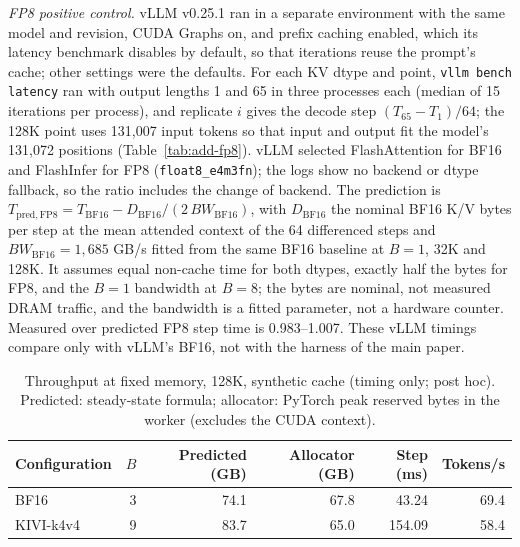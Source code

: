 \textit{FP8 positive control.}
vLLM v0.25.1 ran in a separate environment with the same model and revision, CUDA Graphs on, and prefix caching enabled, which its latency benchmark disables by default, so that iterations reuse the prompt's cache; other settings were the defaults.
For each KV dtype and point, \texttt{vllm bench latency} ran with output lengths 1 and 65 in three processes each (median of 15 iterations per process), and replicate $i$ gives the decode step $(T_{65} - T_1)/64$; the 128K point uses 131,007 input tokens so that input and output fit the model's 131,072 positions (Table~\ref{tab:add-fp8}).
vLLM selected FlashAttention for BF16 and FlashInfer for FP8 (\texttt{float8\_e4m3fn}); the logs show no backend or dtype fallback, so the ratio includes the change of backend.
The prediction is $T_{\mathrm{pred,FP8}} = T_{\mathrm{BF16}} - D_{\mathrm{BF16}} / (2\,BW_{\mathrm{BF16}})$, with $D_{\mathrm{BF16}}$ the nominal BF16 K/V bytes per step at the mean attended context of the 64 differenced steps and $BW_{\mathrm{BF16}} = 1{,}685$ GB/s fitted from the same BF16 baseline at $B = 1$, 32K and 128K.
It assumes equal non-cache time for both dtypes, exactly half the bytes for FP8, and the $B = 1$ bandwidth at $B = 8$; the bytes are nominal, not measured DRAM traffic, and the bandwidth is a fitted parameter, not a hardware counter.
Measured over predicted FP8 step time is 0.983--1.007.
These vLLM timings compare only with vLLM's BF16, not with the harness of the main paper.

\begin{table}[t]
\caption{Throughput at fixed memory, 128K, synthetic cache (timing only; post hoc).
Predicted: steady-state formula; allocator: PyTorch peak reserved bytes in the worker (excludes the CUDA context).}
\label{tab:add-t4}
\vskip 0.1in
\centering
\scriptsize
\setlength{\tabcolsep}{3pt}
\begin{tabular}{@{}lrrrrr@{}}
\toprule
Configuration & $B$ & Predicted (GB) & Allocator (GB) & Step (ms) & Tokens/s \\
\midrule
BF16 & 3 & 74.1 & 67.8 & 43.24 & 69.4 \\
KIVI-k4v4 & 9 & 83.7 & 65.0 & 154.09 & 58.4 \\
\bottomrule
\end{tabular}
\end{table}

